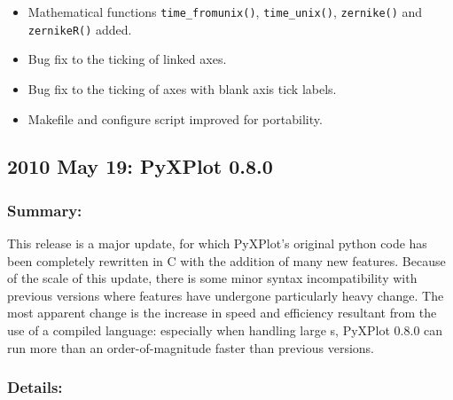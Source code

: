 \begin{itemize}
\item Mathematical functions {\tt time\_\-from\-unix()}, {\tt time\_\-unix()}, {\tt zernike()} and {\tt zernikeR()} added.
\item Bug fix to the ticking of linked axes.
\item Bug fix to the ticking of axes with blank axis tick labels.
\item Makefile and configure script improved for portability.
\end{itemize}

\subsection*{2010 May 19: PyXPlot 0.8.0}

\subsubsection*{Summary:}

This release is a major update, for which PyXPlot's original python code has
been completely rewritten in C with the addition of many new features. Because
of the scale of this update, there is some minor syntax incompatibility with
previous versions where features have undergone particularly heavy change. The
most apparent change is the increase in speed and efficiency resultant from the
use of a compiled language: especially when handling large \datafile s, PyXPlot
0.8.0 can run more than an order-of-magnitude faster than previous versions.

\subsubsection*{Details:}

